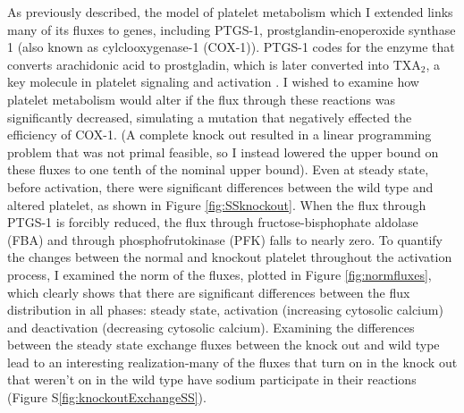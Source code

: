 \documentclass[11pt]{article}
\begin{document}
As previously described, the model of platelet metabolism which I extended links many of its fluxes to genes, including PTGS-1, prostglandin-enoperoxide synthase 1 (also known as cylclooxygenase-1 (COX-1)). PTGS-1 codes for the enzyme that converts arachidonic acid to prostgladin, which is later converted into TXA$_2$, a key molecule in platelet signaling and activation \cite{kunicki2010genetics}. I wished to examine how platelet metabolism would alter if the flux through these reactions was significantly decreased, simulating a mutation that negatively effected the efficiency of COX-1. (A complete knock out resulted in a linear programming problem that was not primal feasible, so I instead lowered the upper bound on these fluxes to one tenth of the nominal upper bound). Even at steady state, before activation, there were significant differences between the wild type and altered platelet, as shown in Figure \ref{fig:SSknockout}. When the flux through PTGS-1 is forcibly reduced, the flux through fructose-bisphophate aldolase (FBA) and through phosphofrutokinase (PFK) falls to nearly zero. To quantify the changes between the normal and knockout platelet throughout the activation process, I examined the norm of the fluxes, plotted in Figure \ref{fig:normfluxes}, which clearly shows that there are significant differences between the flux distribution in all phases: steady state, activation (increasing cytosolic calcium) and deactivation (decreasing cytosolic calcium). Examining the differences between the steady state exchange fluxes between the knock out and wild type lead to an interesting realization-many of the fluxes that turn on in the knock out that weren't on in the wild type have sodium participate in their reactions (Figure S\ref{fig:knockoutExchangeSS}).
\end{document}
